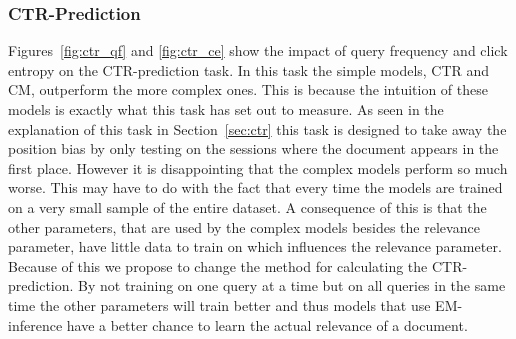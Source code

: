 \subsubsection{CTR-Prediction}
Figures~\ref{fig:ctr_qf} and \ref{fig:ctr_ce} show the impact of query frequency and click entropy on the CTR-prediction task. In this task the simple models, CTR and CM, outperform the more complex ones. This is because the intuition of these models is exactly what this task has set out to measure. As seen in the explanation of this task in Section~\ref{sec:ctr} this task is designed to take away the position bias by only testing on the sessions where the document appears in the first place. However it is disappointing that the complex models perform so much worse. This may have to do with the fact that every time the models are trained on a very small sample of the entire dataset. A consequence of this is that the other parameters, that are used by the complex models besides the relevance parameter, have little data to train on which influences the relevance parameter. Because of this we propose to change the method for calculating the CTR-prediction. By not training on one query at a time but on all queries in the same time the other parameters will train better and thus models that use EM-inference have a better chance to learn the actual relevance of a document.

